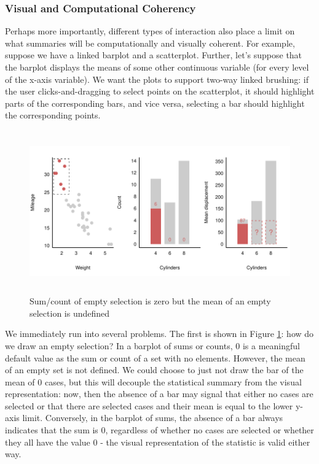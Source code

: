 \documentclass[12pt,a4paper]{article}
\begin{document}
\subsubsection{Visual and Computational Coherency}
\label{sec:coherency}

Perhaps more importantly, different types of interaction also place a limit on what summaries will be computationally and visually coherent. For example, suppose we have a linked barplot and a scatterplot. Further, let's suppose that the barplot displays the means of some other continuous variable (for every level of the x-axis variable). We want the plots to support two-way linked brushing: if the user clicks-and-dragging to select points on the scatterplot, it should highlight parts of the corresponding bars, and vice versa, selecting a bar should highlight the corresponding points.

\begin{figure}[H]
\centering
\includegraphics[height=70mm]{./figure01.pdf}
\caption{Sum/count of empty selection is zero but the mean of an empty selection is undefined}
\label{fig:empty}
\end{figure}

We immediately run into several problems. The first is shown in Figure \ref{fig:empty}: how do we draw an empty selection? In a barplot of sums or counts, 0 is a meaningful default value as the sum or count of a set with no elements. However, the mean of an empty set is not defined. We could choose to just not draw the bar of the mean of 0 cases, but this will decouple the statistical summary from the visual representation: now, then the absence of a bar may signal that either no cases are selected or that there are selected cases and their mean is equal to the lower y-axis limit. Conversely, in the barplot of sums, the absence of a bar always indicates that the sum is 0, regardless of whether no cases are selected or whether they all have the value 0 - the visual representation of the statistic is valid either way.  
\end{document}
